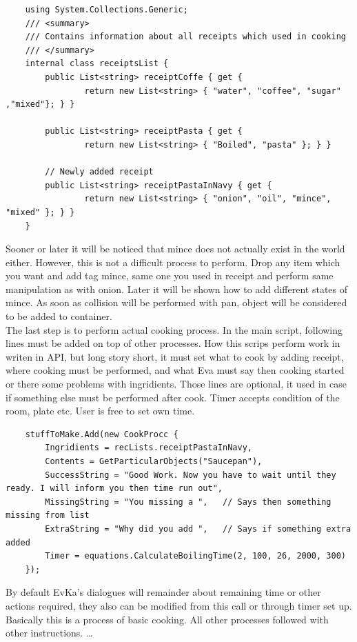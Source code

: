 \documentclass[18pt]{article}
\numberwithin{equation}{section} %
\numberwithin{figure}{section} %
\numberwithin{table}{section} %
\begin{document}
	\lstset{style=sharpc}
	\begin{lstlisting}
	using System.Collections.Generic;
	/// <summary>
	/// Contains information about all receipts which used in cooking
	/// </summary>
	internal class receiptsList {    
		public List<string> receiptCoffe { get { 
				return new List<string> { "water", "coffee", "sugar" ,"mixed"}; } }
				
		public List<string> receiptPasta { get { 
				return new List<string> { "Boiled", "pasta" }; } }
		
		// Newly added receipt		
		public List<string> receiptPastaInNavy { get { 
				return new List<string> { "onion", "oil", "mince", "mixed" }; } }
	}
	\end{lstlisting}
	
	Sooner or later it will be noticed that mince does not actually exist in the world either. However, this is not a difficult process to perform. Drop any item which you want and add tag mince, same one you used in receipt and perform same manipulation as with onion. Later it will be shown how to add different states of mince. As soon as collision will be performed with pan, object will be considered to be added to container. \\
	
	The last step is to perform actual cooking process. In the main script, following lines must be added on top of other processes. How this scrips perform work in writen in API, but long story short, it must set what to cook by adding receipt, where cooking must be performed, and what Eva must say then cooking started or there some problems with ingridients. Those lines are optional, it used in case if something else must be performed after cook. Timer accepts condition of the room, plate etc. User is free to set own time.
	
	\lstset{style=sharpc}
	\begin{lstlisting}
	stuffToMake.Add(new CookProcc {
		Ingridients = recLists.receiptPastaInNavy,
		Contents = GetParticularObjects("Saucepan"),
		SuccessString = "Good Work. Now you have to wait until they ready. I will inform you then time run out",
		MissingString = "You missing a ",	// Says then something missing from list
		ExtraString = "Why did you add ",	// Says if something extra added
		Timer = equations.CalculateBoilingTime(2, 100, 26, 2000, 300)
	});
	\end{lstlisting}
	By default EvKa's dialogues will remainder about remaining time or other actions required, they also can be modified from this call or through timer set up. Basically this is a process of basic cooking. All other processes followed with other instructions. \ldots
	
\end{document}
